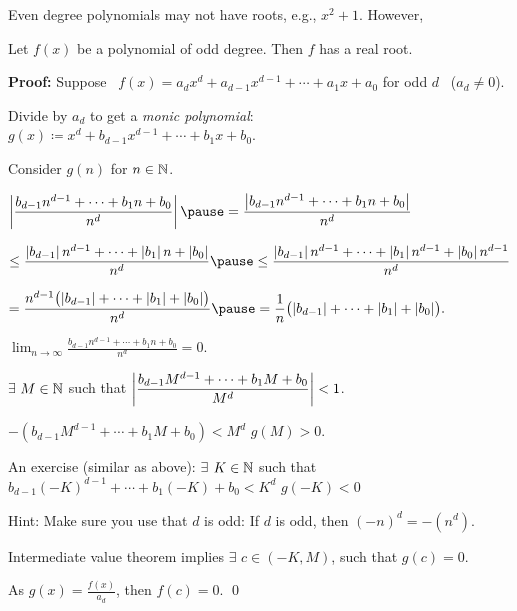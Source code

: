\documentclass[10pt,aspectratio=149]{beamer}
\begin{document}
\begin{frame}
Even degree polynomials may not have roots, e.g., 
$x^2+1$.
\pause
However,

\begin{proposition}
Let $f(x)$ be a polynomial of odd degree.  Then $f$ has a real root.
\end{proposition}

\pause
\textbf{Proof:}
Suppose ~$f(x) = a_d x^d + a_{d-1} x^{d-1} + \cdots + a_1 x + a_0$ for odd
$d$ ~($a_d \not= 0$).

\pause
Divide by $a_d$ to get a \emph{monic polynomial}:
~ $g(x) \coloneqq x^d + b_{d-1} x^{d-1} + \cdots + b_1 x + b_0$.

\pause
\medskip

Consider $g(n)$ for $n \in {\mathbb{N}}$.

\pause
\medskip

$\displaystyle
\abs{\frac{b_{d-1} n^{d-1} + \cdots + b_1 n + b_0}{n^d}}
\pause
 =
\frac{\abs{b_{d-1} n^{d-1} + \cdots + b_1 n + b_0}}{n^d}
$

\pause
\medskip

\quad
$\displaystyle
\leq
\frac{\abs{b_{d-1}} n^{d-1} + \cdots + \abs{b_1} n + \abs{b_0}}{n^d}
\pause
\leq
\frac{\abs{b_{d-1}} n^{d-1} + \cdots + \abs{b_1} n^{d-1} + \abs{b_0} n^{d-1}}{n^d}
$

\pause
\medskip

\quad
$\displaystyle
=
\frac{n^{d-1}\bigl(\abs{b_{d-1}} + \cdots + \abs{b_1} + \abs{b_0}\bigr)}{n^d}
\pause
=
\frac{1}{n}
\bigl(\abs{b_{d-1}} + \cdots + \abs{b_1} + \abs{b_0}\bigr) .
$

\pause
\medskip

\thus \quad
$\displaystyle
\lim_{n\to\infty} \frac{b_{d-1} n^{d-1} + \cdots + b_1 n + b_0}{n^d}
= 0$.

\end{frame}

\begin{frame}

\thus \quad $\exists$ $M \in {\mathbb{N}}$ \quad such that 
\quad
$\displaystyle \left\lvert {\frac{b_{d-1} M^{d-1} + \cdots + b_1 M + b_0}{M^d}} \right\rvert < 1$.

\pause
\medskip

\thus \quad 
$\displaystyle
-(b_{d-1} M^{d-1} + \cdots + b_1 M + b_0) < M^d$
\pause
\wthus
$g(M) > 0$.

\pause
\medskip

An exercise (similar as above):
$\exists$ $K \in {\mathbb{N}}$ such that
$b_{d-1} {(-K)}^{d-1} + \cdots + b_1 (-K) + b_0 < K^d$
\wthus $g(-K) < 0$

\pause
\medskip

Hint: Make sure you use that $d$ is odd: If $d$ is odd, then ${(-n)}^d = -(n^d)$.

\pause
\medskip

Intermediate value theorem implies $\exists$
$c \in (-K,M)$, such that $g(c) = 0$.

\pause
\medskip

As $g(x) = \frac{f(x)}{a_d}$, then $f(c) = 0$.
\qed
\end{frame}
\end{document}
